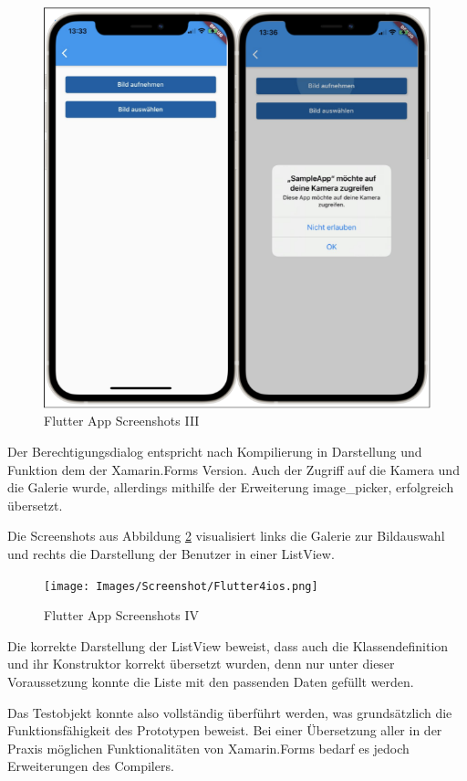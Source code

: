 \begin{figure}[!ht]
 \includegraphics[width=\textwidth,keepaspectratio]{Images/Screenshot/Flutterios3.png}
 \caption{Flutter App Screenshots III}
 \label{fig:FlutterAppIII}
\end{figure}
Der Berechtigungsdialog entspricht nach Kompilierung in Darstellung und 
Funktion dem der Xamarin.Forms Version.  Auch der Zugriff auf die Kamera und die Galerie wurde, allerdings mithilfe der Erweiterung \glq image\_picker\grq , erfolgreich übersetzt.

Die Screenshots aus Abbildung \ref{fig:FlutterAppIV} visualisiert links die Galerie zur Bildauswahl und rechts die Darstellung der Benutzer in einer ListView.  


 \newpage 
\begin{figure}[!ht]
 \texttt{[image: Images/Screenshot/Flutter4ios.png]}
 \caption{Flutter App Screenshots IV}
 \label{fig:FlutterAppIV}
\end{figure}
Die korrekte Darstellung der \glq ListView\grq{} beweist, dass auch die Klassendefinition und ihr Konstruktor korrekt übersetzt wurden, denn nur unter dieser Voraussetzung konnte die Liste mit den  passenden Daten gefüllt werden.

Das Testobjekt konnte also vollständig überführt werden, was grundsätzlich die 
Funktionsfähigkeit des Prototypen beweist.  Bei einer Übersetzung aller in der Praxis möglichen 
Funktionalitäten von Xamarin.Forms bedarf es jedoch Erweiterungen des Compilers. 


